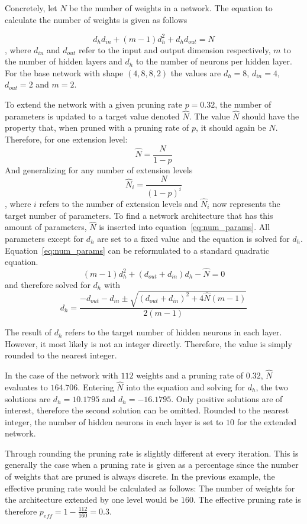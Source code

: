Concretely, let $N$ be the number of weights in a network.
The equation to calculate the number of weights is given as follows

\begin{equation} \label{eq:num_params}
d_h d_{in}+(m-1)d_h^2 + d_h d_{out} = N
\end{equation}
, where $d_{in}$ and $d_{out}$ refer to the input and output dimension respectively, $m$ to the number of hidden layers and
$d_h$ to the number of neurons per hidden layer.
For the base network with shape $(4, 8, 8, 2)$ the values are $d_h=8$, 
$d_{in}=4$, $d_{out}=2$ and $m=2$.
 
To extend the network with a given pruning rate $p=0.32$, the number of parameters is updated to a target value denoted $\hat N$.
The value $\hat N$ should have the property that, when pruned with a pruning rate of $p$, it should again be $N$.
Therefore, for one extension level:
\[ \hat N = {\frac{N}{1-p}} \]
And generalizing for any number of extension levels
\[ \hat N_i = {\frac{N}{{(1-p)}^i}} \]
, where $i$ refers to the number of extension levels and $\hat N_i$ now represents the target number of parameters. 
To find a network architecture that has this amount of parameters, $\hat N$ is inserted into equation~\ref{eq:num_params}.
All parameters except for $d_h$ are set to a fixed value and the equation is solved for $d_h$.
Equation~\ref{eq:num_params} can be reformulated to a standard quadratic equation.
\[ (m-1)d_h^2 + (d_{out} + d_{in}) d_h - \hat N = 0 \]
and therefore solved for $d_h$ with 
\[
    d_h = \frac{
        -d_{out} - d_{in} \pm \sqrt{{(d_{out} + d_{in})}^2 + 4 \hat N(m-1)} 
    }{
        2(m-1)
    }
\]

The result of $d_h$ refers to the target number of hidden neurons in each layer.
However, it most likely is not an integer directly.
Therefore, the value is simply rounded to the nearest integer.

In the case of the network with $112$ weights and a pruning rate of $0.32$, $\hat N$ evaluates to $164.706$.
Entering $\hat N$ into the equation and solving for $d_h$, the two solutions are $d_h=10.1795$ and $d_h=-16.1795$.
Only positive solutions are of interest, therefore the second solution can be omitted.
Rounded to the nearest integer, the number of hidden neurons in each layer is set to $10$ for the extended network.

Through rounding the pruning rate is slightly different at every iteration.
This is generally the case when a pruning rate is given as a percentage since the number of weights that are pruned is always discrete.
In the previous example, the effective pruning rate would be calculated as follows:
The number of weights for the architecture extended by one level would be $160$.
The effective pruning rate is therefore $p_{eff}=1-\frac{112}{160}=0.3$.

